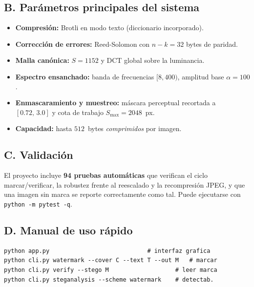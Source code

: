 \documentclass[12pt,a4paper]{article}
\renewcommand{\nobreakdash}{}
\begin{document}
\subsection*{B. Parámetros principales del sistema}
\begin{itemize}[leftmargin=1.6em]
\item \textbf{Compresión:} Brotli en modo texto (diccionario incorporado).
\item \textbf{Corrección de errores:} Reed\nobreakdash-Solomon con $n-k=32$ bytes de paridad.
\item \textbf{Malla canónica:} $S=1152$ y DCT global sobre la luminancia.
\item \textbf{Espectro ensanchado:} banda de frecuencias $[8,400)$, amplitud base $\alpha=100$.
\item \textbf{Enmascaramiento y muestreo:} máscara perceptual recortada a $[0{.}72,\,3{.}0]$ y
cota de trabajo $S_{\max}=2048$~px.
\item \textbf{Capacidad:} hasta $512$~bytes \emph{comprimidos} por imagen.
\end{itemize}

\subsection*{C. Validación}
El proyecto incluye \textbf{94 pruebas automáticas} que verifican el ciclo marcar/verificar,
la robustez frente al reescalado y la recompresión JPEG, y que una imagen sin marca se
reporte correctamente como tal. Puede ejecutarse con \texttt{python -m pytest -q}.

\subsection*{D. Manual de uso rápido}
{\footnotesize
\begin{verbatim}
python app.py                            # interfaz grafica
python cli.py watermark --cover C --text T --out M   # marcar
python cli.py verify --stego M                   # leer marca
python cli.py steganalysis --scheme watermark    # detectab.
\end{verbatim}
}
\end{document}
